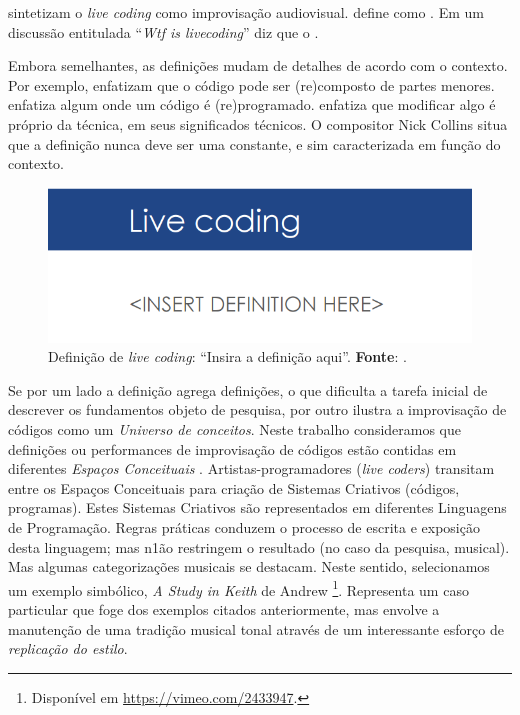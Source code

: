  sintetizam o \emph{live coding} como improvisação audiovisual.  define como . Em um discussão entitulada ``\emph{Wtf is livecoding}'' diz que o  .

Embora semelhantes, as definições mudam de detalhes de acordo com o contexto. Por exemplo,  enfatizam que o código pode ser (re)composto de partes menores.  enfatiza algum onde um código é (re)programado.  enfatiza que modificar algo é próprio da técnica, em seus significados técnicos. O compositor Nick Collins situa que a definição nunca deve ser uma constante, e sim caracterizada em função do contexto. 

  \begin{figure}[h]
    \centering
    \includegraphics[scale=0.7]{imagens/live_coding_def.png}
    \caption{Definição de \emph{live coding}: ``Insira a definição aqui''. \textbf{Fonte}: .}
    \label{fig:live_coding_def}
  \end{figure}


Se por um lado a definição agrega definições, o que dificulta a tarefa inicial de descrever os fundamentos objeto de pesquisa, por outro ilustra a improvisação de códigos como um \emph{Universo de conceitos}. Neste trabalho consideramos que definições ou performances de improvisação de códigos estão contidas em diferentes \emph{Espaços Conceituais} \cite{wiggins_framework_2006,mclean_music_2006}. Artistas-programadores (\emph{live coders}) transitam entre os Espaços Conceituais para criação de Sistemas Criativos (códigos, programas). Estes Sistemas Criativos são representados em diferentes Linguagens de Programação. Regras práticas conduzem o processo de escrita e exposição desta linguagem; mas n1ão restringem o resultado (no caso da pesquisa, musical). Mas algumas categorizações musicais se destacam.  Neste sentido, selecionamos um exemplo simbólico, \emph{A Study in Keith} de Andrew \footnote{Disponível em \url{https://vimeo.com/2433947}.}. Representa um caso particular que foge dos exemplos citados anteriormente, mas envolve a manutenção de uma tradição musical tonal através de um interessante esforço de \emph{replicação do estilo}. 

